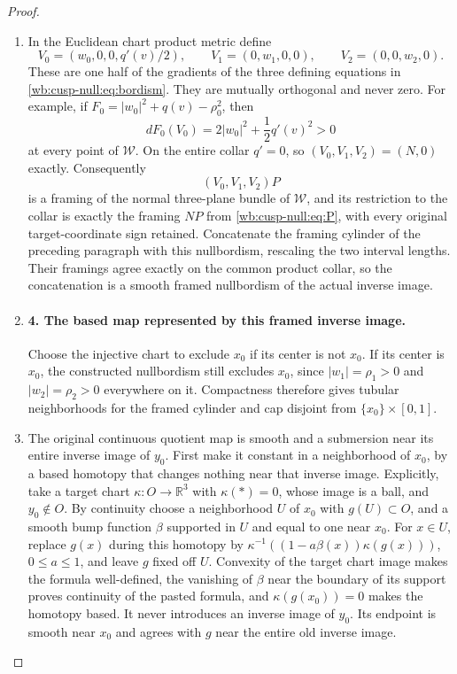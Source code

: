 \begin{proof}
\begin{enumerate}[label=\arabic*.,leftmargin=*]
\item In the Euclidean chart product metric define
\[
 V_0=(w_0,0,0,q'(v)/2),\qquad
 V_1=(0,w_1,0,0),\qquad V_2=(0,0,w_2,0).
\]
These are one half of the gradients of the three defining equations
in \eqref{wb:cusp-null:eq:bordism}. They are mutually orthogonal and never zero.
For example, if \(F_0=|w_0|^2+q(v)-\rho_0^2\), then
\[
 dF_0(V_0)=2|w_0|^2+\frac12q'(v)^2>0
\]
at every point of \(\mathcal W\). On the entire collar \(q'=0\), so
\((V_0,V_1,V_2)=(N,0)\) exactly. Consequently
\begin{equation}
 (V_0,V_1,V_2)P
 \label{wb:cusp-null:eq:extended-frame}
\end{equation}
is a framing of the normal three-plane bundle of \(\mathcal W\),
and its restriction to the collar is exactly the framing \(NP\) from
\eqref{wb:cusp-null:eq:P}, with every original target-coordinate sign retained.
Concatenate the framing cylinder of the preceding paragraph with this
nullbordism, rescaling the two interval lengths. Their framings agree
exactly on the common product collar, so the concatenation is a smooth
framed nullbordism of the actual inverse image.

\item \paragraph{4. The based map represented by this framed inverse image.}
Choose the injective chart to exclude \(x_0\) if its center is not
\(x_0\). If its center is \(x_0\), the constructed nullbordism still
excludes \(x_0\), since \(|w_1|=\rho_1>0\) and
\(|w_2|=\rho_2>0\) everywhere on it. Compactness therefore gives
tubular neighborhoods for the framed cylinder and cap disjoint from
\(\{x_0\}\times[0,1]\).

\item The original continuous quotient map is smooth and a submersion near
its entire inverse image of \(y_0\). First make it constant in a
neighborhood of \(x_0\), by a based homotopy that changes nothing near
that inverse image. Explicitly, take a target chart
\(\kappa:O\to\mathbb R^3\) with \(\kappa(*)=0\), whose image is a ball,
and \(y_0\notin O\). By continuity choose a neighborhood \(U\) of
\(x_0\) with \(g(U)\subset O\), and a smooth bump function
\(\beta\) supported in \(U\) and equal to one near \(x_0\).
For \(x\in U\), replace \(g(x)\) during this homotopy by
\(\kappa^{-1}((1-a\beta(x))\kappa(g(x)))\), \(0\leq a\leq1\),
and leave \(g\) fixed off \(U\). Convexity of the target chart image
makes the formula well-defined, the vanishing of \(\beta\) near the
boundary of its support proves continuity of the pasted formula, and
\(\kappa(g(x_0))=0\) makes the homotopy based. It never introduces
an inverse image of \(y_0\). Its endpoint is smooth near \(x_0\) and
agrees with \(g\) near the entire old inverse image.


\end{enumerate}
\end{proof}
